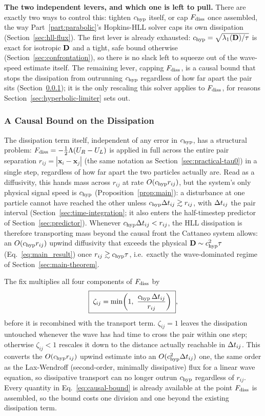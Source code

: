 \textbf{The two independent levers, and which one is left to pull.}
There are exactly two ways to control this: tighten $c_{\rm hyp}$ itself, or
cap $F_{\rm diss}$ once assembled, the way Part~\ref{part:parabolic}'s
Hopkins-HLL solver caps its own dissipation (Section~\ref{sec:hll-flux}).
The first lever is already exhausted:
$c_{\rm hyp}=\sqrt{\lambda_1(\mathbf{D})/\tau}$ is exact for isotropic $\mathbf{D}$
and a tight, safe bound otherwise (Section~\ref{sec:confrontation}), so
there is no slack left to squeeze out of the wave-speed estimate itself.
The remaining lever, capping $F_{\rm diss}$, is a causal bound that stops
the dissipation from outrunning $c_{\rm hyp}$ regardless of how far apart the
pair sits (Section~\ref{sec:causal-bound}); it is the only rescaling this
solver applies to $F_{\rm diss}$, for reasons
Section~\ref{sec:hyperbolic-limiter} sets out.

\subsubsection{A Causal Bound on the Dissipation}
\label{sec:causal-bound}

The dissipation term itself, independent of any error in $c_{\rm hyp}$, has a
structural problem: $F_{\rm diss}=-\tfrac12\Lambda(U_R-U_L)$ is applied in
full across the entire pair separation
$r_{ij}=|\mathbf x_i-\mathbf x_j|$ (the same notation as
Section~\ref{sec:practical-tau0}) in a single step, regardless of how far
apart the two particles actually are. Read as a diffusivity, this hands
mass across $r_{ij}$ at rate $O(c_{\rm hyp} r_{ij})$, but the system's only
physical signal speed is $c_{\rm hyp}$ (Proposition~\ref{prop:main}): a
disturbance at one particle cannot have reached the other unless
$c_{\rm hyp}\Delta t_{ij}\gtrsim r_{ij}$, with $\Delta t_{ij}$ the pair interval
(Section~\ref{sec:time-integration}; it also enters the
half-timestep predictor of Section~\ref{sec:predictor}). Whenever
$c_{\rm hyp}\Delta t_{ij}<r_{ij}$, the HLL dissipation is therefore transporting
mass beyond the causal front the Cattaneo system allows: an $O(c_{\rm hyp}
r_{ij})$ upwind diffusivity that exceeds the physical
$\mathbf{D}\sim c_{\rm hyp}^2\tau$ (Eq.~\eqref{eq:main_result}) once
$r_{ij}\gtrsim c_{\rm hyp}\tau$, i.e.\ exactly the wave-dominated regime of
Section~\ref{sec:main-theorem}.

The fix multiplies all four components of $F_{\rm diss}$ by
\begin{equation}
  \label{eq:causal-bound}
  \boxed{\;\zeta_{ij} = \min\!\left(1,\ \frac{\chyp\,\dt_{ij}}{r_{ij}}\right)\;} ,
\end{equation}
before it is recombined with the transport term. $\zeta_{ij}=1$ leaves the
dissipation untouched whenever the wave has had time to cross the pair
within one step; otherwise $\zeta_{ij}<1$ rescales it down to the distance
actually reachable in $\Delta t_{ij}$. This converts the $O(c_{\rm hyp} r_{ij})$
upwind estimate into an $O(c_{\rm hyp}^2\Delta t_{ij})$ one, the same order as the
Lax-Wendroff (second-order, minimally dissipative) flux for a linear wave
equation, so dissipative transport can no longer outrun $c_{\rm hyp}$
regardless of $r_{ij}$. Every quantity in Eq.~\eqref{eq:causal-bound} is
already available at the point $F_{\rm diss}$ is assembled, so the bound
costs one division and one  beyond the existing dissipation
term.

